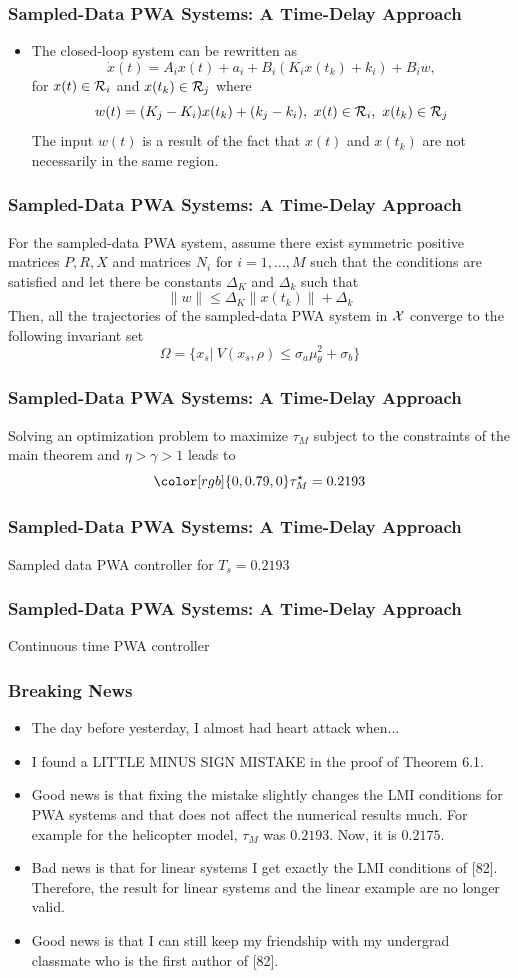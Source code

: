\documentclass{beamer}
\newcommand{\red}{\color[rgb]{1,0,0}}
\newcommand{\green}{\color[rgb]{0,0.79,0}}
\newcommand{\RR}{{\cal R}}
\newcommand{\beq}{\begin{equation*}}
\newcommand{\eeq}{\end{equation*}}
\begin{document}
  \frame
  {
    \frametitle{Sampled-Data PWA Systems: A Time-Delay Approach}
\begin{itemize}
\item The closed-loop system can be rewritten as
\beq
\dot x(t)=A_ix(t)+a_i+B_i(K_ix(t_k)+k_i)+B_iw,
\eeq
for $x(t)\in\RR_i$ and $x(t_k)\in\RR_j$ where
\beq
w(t) = (K_j-K_i)x(t_k)+(k_j-k_i),\ x(t)\in\RR_i,\ x(t_k)\in\RR_j
\eeq
The input $w(t)$ is a result of the fact that $x(t)$ and $x(t_k)$ are not necessarily in the same region. 
\end{itemize}
}

  \frame
  {
    \frametitle{Sampled-Data PWA Systems: A Time-Delay Approach}
\begin{theorem}[6.1]
For the sampled-data PWA system, assume there exist symmetric positive matrices $P,R,X$ and matrices $N_i$ for $i=1,\ldots,M$ such that the conditions are satisfied and let there be constants $\Delta_K$ and $\Delta_k$ such that
\beq
\|w\|\leq \Delta_K\|x(t_k)\|+\Delta_k
\eeq
Then, all the trajectories of the sampled-data PWA system  in ${\cal X}$ converge to the following invariant set
\beq
\Omega = \{x_s|\ V(x_s,\rho)\leq \sigma_a\mu_\theta^2+\sigma_b \}
\eeq
\end{theorem}
}

\frame
  {  
    \frametitle{Sampled-Data PWA Systems: A Time-Delay Approach}
Solving an optimization problem to maximize $\tau_M$ subject to the constraints of the main theorem and $\eta>\gamma>1$ leads to
\beq
{\green \tau_M^\star = 0.2193 }
\eeq
}

\frame
  {  
  \frametitle{Sampled-Data PWA Systems: A Time-Delay Approach}
\centerline{\resizebox{8cm}{!}{}}
\centerline{Sampled data PWA controller for $T_s=0.2193$}    
}

\frame
  {  
  \frametitle{Sampled-Data PWA Systems: A Time-Delay Approach}
\centerline{\resizebox{8cm}{!}{}}
\centerline{Continuous time PWA controller}    
}

\frame
{
  \frametitle{Breaking News}
\begin{itemize}
\item<1-> The day before yesterday, I almost had heart attack when...
\item<2-> I found a {\Large {\red LITTLE MINUS SIGN MISTAKE}} in the proof of Theorem 6.1.
\item<3-> {\green Good news} is that fixing the mistake slightly changes the LMI conditions for PWA systems and that does not affect the numerical results much. For example for the helicopter model, $\tau_M$ was $0.2193$. Now, it is $0.2175$.
\item<4-> {\red Bad news} is that for linear systems I get exactly the LMI conditions of [82]. Therefore, the result for linear systems and the linear example are no longer valid.
\item<5-> {\green Good news} is that I can still keep my friendship with my undergrad classmate who is the first author of [82]. 
\end{itemize}
}
\end{document}
